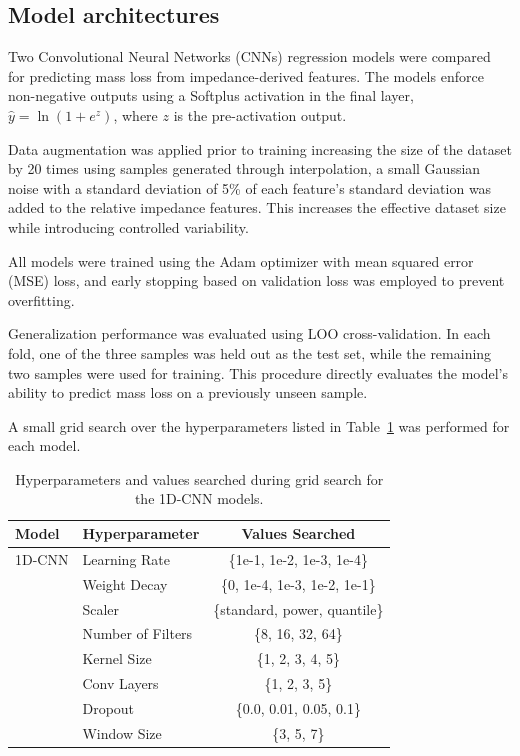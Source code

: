 \documentclass[journal,twoside,web]{ieeecolor}
\begin{document}
\subsection{Model architectures}\label{sec:models}

Two Convolutional Neural Networks (CNNs) regression models were compared for predicting mass loss from impedance-derived features. The models enforce non-negative outputs using a Softplus activation in the final layer, $\hat{y} = \ln(1 + e^z)$, where $z$ is the pre-activation output.

Data augmentation was applied prior to training increasing the size of the dataset by 20 times using samples generated through interpolation, a small Gaussian noise with a standard deviation of 5\% of each feature’s standard deviation was added to the relative impedance features. This increases the effective dataset size while introducing controlled variability.

All models were trained using the Adam optimizer with mean squared error (MSE) loss, and early stopping based on validation loss was employed to prevent overfitting.

Generalization performance was evaluated using LOO cross-validation. In each fold, one of the three samples was held out as the test set, while the remaining two samples were used for training. This procedure directly evaluates the model’s ability to predict mass loss on a previously unseen sample.

A small grid search over the hyperparameters listed in Table~\ref{tab:hyperparams} was performed for each model.

\begin{table}[ht]
\centering
\small
\begin{tabular}{llc}
\hline
\textbf{Model} & \textbf{Hyperparameter} & \textbf{Values Searched} \\
\hline
1D-CNN
 & Learning Rate        & \{1e-1, 1e-2, 1e-3, 1e-4\} \\
 & Weight Decay         & \{0, 1e-4, 1e-3, 1e-2, 1e-1\} \\
 & Scaler               & \{standard, power, quantile\} \\
 & Number of Filters    & \{8, 16, 32, 64\} \\
 & Kernel Size          & \{1, 2, 3, 4, 5\} \\
 & Conv Layers          & \{1, 2, 3, 5\} \\
 & Dropout              & \{0.0, 0.01, 0.05, 0.1\} \\
 & Window Size          & \{3, 5, 7\} \\
\hline

\end{tabular}
\caption{Hyperparameters and values searched during grid search for the 1D-CNN models.}
\label{tab:hyperparams}
\end{table}
\end{document}
